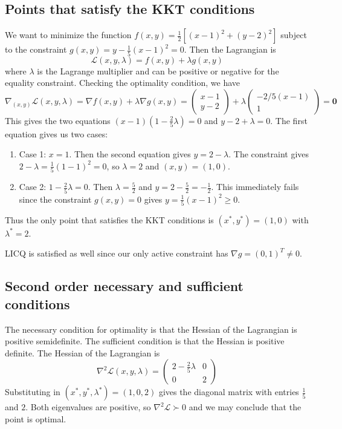 \documentclass[11pt]{article}
\newcommand{\pvec}[1]{\begin{pmatrix}#1\end{pmatrix}}
\theoremstyle{problemstyle}
\begin{document}
\subsection*{Points that satisfy the KKT conditions}
We want to minimize the function $f(x,y) = \tfrac{1}{2}\left[(x-1)^2 +
(y-2)^2\right]$ subject to the constraint $g(x,y) = y - \tfrac{1}{5}(x-1)^2 =
0$. Then the Lagrangian is
\[
  \mathcal{L}(x,y,\lambda) = f(x,y) + \lambda g(x,y)
\]
where $\lambda$ is the Lagrange multiplier and can be positive or negative for
the equality constraint. Checking the optimality condition, we have
\[
  \nabla_{(x,y)} \mathcal{L}(x,y,\lambda) = \nabla f(x,y) + \lambda \nabla g(x,y)
  = \pvec{x-1\\y-2} + \lambda \pvec{-2/5(x-1)\\1} = \mathbf{0}
\]
This gives the two equations $(x-1)(1 - \tfrac{2}{5}\lambda) = 0$ and $y - 2 +
\lambda = 0$. The first equation gives us two cases:
\begin{enumerate}
  \item Case 1: $x = 1$.
        Then the second equation gives $y = 2 - \lambda$.
        The constraint gives $2 - \lambda = \tfrac{1}{5}(1-1)^2 = 0$,
        so $\lambda = 2$ and $(x,y) = (1,0)$.

  \item Case 2: $1 - \tfrac{2}{5}\lambda = 0$.
        Then $\lambda = \tfrac{5}{2}$ and $y = 2 - \tfrac{5}{2} =
        -\tfrac{1}{2}$. This immediately fails since the constraint $g(x,y) = 0$
        gives $y = \tfrac{1}{5}(x-1)^2 \geq 0$.
\end{enumerate}
\noindent Thus the only point that satisfies the KKT conditions is $(x^*,y^*) =
(1,0)$ with $\lambda^* = 2$.

\noindent LICQ is satisfied as well since our only active constraint has $\nabla g =
(0,1)^T \neq 0$. 

\subsection*{Second order necessary and sufficient conditions}
The necessary condition for optimality is that the Hessian of the Lagrangian is
positive semidefinite. The sufficient condition is that the Hessian is positive
definite. The Hessian of the Lagrangian is
\[
  \nabla^2 \mathcal{L}(x,y,\lambda) = \pvec{2 -\frac{2}{5} \lambda & 0\\0 & 2}
\]
Substituting in $(x^*,y^*,\lambda^*) = (1,0,2)$ gives the diagonal matrix with
entries $\frac{1}{5}$ and $2$. Both eigenvalues are positive, so $\nabla^2
\mathcal{L} \succ 0$ and we may conclude that the point is optimal.
\end{document}
